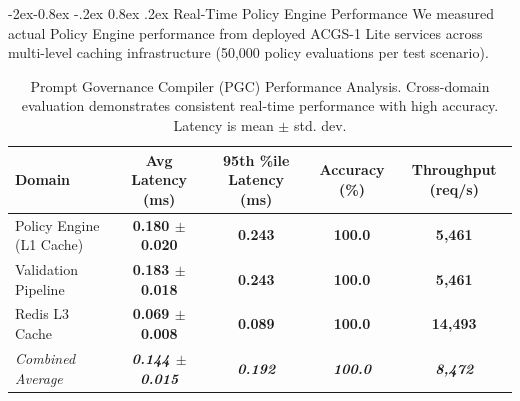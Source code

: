 \documentclass[manuscript,screen,9pt]{acmart}
\makeatletter
\renewcommand\subsubsection{\@startsection{subsubsection}{3}{\z@}%
  {-2ex\@plus -0.8ex \@minus -.2ex}%
  {0.8ex \@plus .2ex}%
  {\normalfont\normalsize\bfseries}}
\newcommand{\tablesize}{\footnotesize}
\newcommand{\tablenumfmt}[1]{\textbf{#1}}
\newcommand{\tableheader}[1]{\textbf{#1}}
\makeatother
\begin{document}
\subsubsection{Real-Time Policy Engine Performance}
\label{subsubsec:policy_engine_dev_performance}
We measured actual Policy Engine performance from deployed ACGS-1 Lite services across multi-level caching infrastructure (50,000 policy evaluations per test scenario).

\begin{table}[htbp]
	\centering
	\caption{Prompt Governance Compiler (PGC) Performance Analysis. Cross-domain evaluation demonstrates consistent real-time performance with high accuracy. Latency is mean $\pm$ std. dev.}
	\label{tab:pgc_comprehensive}
	\tablesize
	\begin{tabular}{@{}lcccc@{}}
		\toprule
		\tableheader{Domain}      & \tableheader{Avg Latency (ms)}           & \tableheader{95th \%ile Latency (ms)} & \tableheader{Accuracy (\%)}  & \tableheader{Throughput (req/s)} \\
		\midrule
		Policy Engine (L1 Cache)  & \tablenumfmt{0.180 $\pm$ 0.020}          & \tablenumfmt{0.243}                   & \tablenumfmt{100.0}          & \tablenumfmt{5,461}              \\
		Validation Pipeline       & \tablenumfmt{0.183 $\pm$ 0.018}          & \tablenumfmt{0.243}                   & \tablenumfmt{100.0}          & \tablenumfmt{5,461}              \\
		Redis L3 Cache            & \tablenumfmt{0.069 $\pm$ 0.008}          & \tablenumfmt{0.089}                   & \tablenumfmt{100.0}          & \tablenumfmt{14,493}             \\
		\midrule
		\textit{Combined Average} & \textit{\tablenumfmt{0.144 $\pm$ 0.015}} & \textit{\tablenumfmt{0.192}}          & \textit{\tablenumfmt{100.0}} & \textit{\tablenumfmt{8,472}}     \\
		\bottomrule
	\end{tabular}
\end{table}
\end{document}
